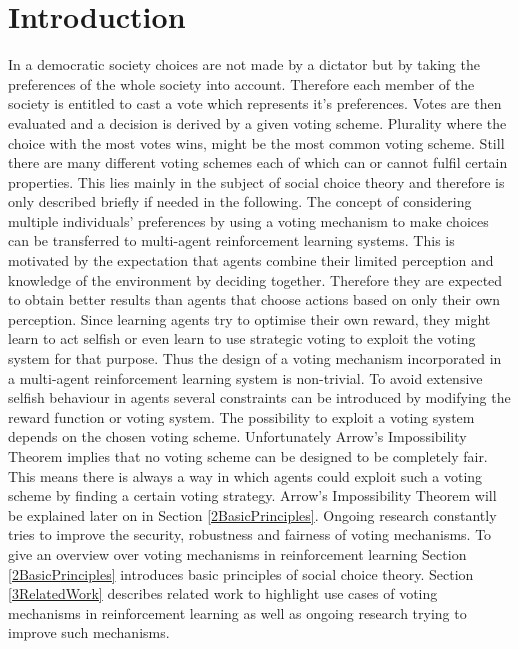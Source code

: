 \documentclass[conference]{IEEEtran}
\begin{document}
\section{Introduction}
In a democratic society choices are not made by a dictator but by taking the preferences of the whole society into account. Therefore each member of the society is entitled to cast a vote which represents it's preferences. Votes are then evaluated and a decision is derived by a given voting scheme. Plurality where the choice with the most votes wins, might be the most common voting scheme. Still there are many different voting schemes each of which can or cannot fulfil certain properties. This lies mainly in the subject of social choice theory and therefore is only described briefly if needed in the following.
\newline
The concept of considering multiple individuals' preferences by using a voting mechanism to make choices can be transferred to multi-agent reinforcement learning systems. This is motivated by the expectation that agents combine their limited perception and knowledge of the environment by deciding together. Therefore they are expected to obtain better results than agents that choose actions based on only their own perception.\cite{partalas2008hybrid}
\newline
Since learning agents try to optimise their own reward, they might learn to act selfish\cite{carr2008peer} or even learn to use strategic voting to exploit the voting system\cite{pitt2006voting} for that purpose.
Thus the design of a voting mechanism incorporated in a multi-agent reinforcement learning system is non-trivial.
To avoid extensive selfish behaviour in agents several constraints can be introduced by modifying the reward function or voting system.
The possibility to exploit a voting system depends on the chosen voting scheme.
Unfortunately Arrow's Impossibility Theorem implies that no voting scheme can be designed to be completely fair. This means there is always a way in which agents could exploit such a voting scheme by finding a certain voting strategy. Arrow's Impossibility Theorem will be explained later on in Section \ref{2BasicPrinciples}.
Ongoing research constantly tries to improve the security, robustness and fairness of voting mechanisms.
\newline
To give an overview over voting mechanisms in reinforcement learning Section \ref{2BasicPrinciples} introduces basic principles of social choice theory.
Section \ref{3RelatedWork} describes related work to highlight use cases of voting mechanisms in reinforcement learning as well as ongoing research trying to improve such mechanisms.
\end{document}
